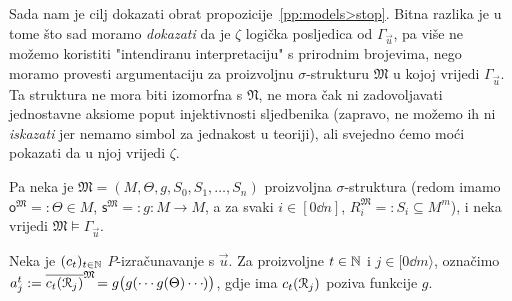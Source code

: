 Sada nam je cilj dokazati obrat propozicije~\ref{pp:models>stop}. Bitna razlika je u tome što sad moramo \emph{dokazati} da je $\zeta$ logička posljedica od $\Gamma_{\vec u}$, pa više ne možemo koristiti "intendiranu interpretaciju" s prirodnim brojevima, nego moramo provesti argumentaciju za proizvoljnu $\sigma$-strukturu $\mathfrak M$ u kojoj vrijedi $\Gamma_{\vec u}$. Ta struktura ne mora biti izomorfna s $\mathfrak N$, ne mora čak ni zadovoljavati jednostavne aksiome poput injektivnosti sljedbenika (zapravo, ne možemo ih ni \emph{iskazati} jer nemamo simbol za jednakost u teoriji), ali svejedno ćemo moći pokazati da u njoj vrijedi $\zeta$.

Pa neka je $\mathfrak M=(M,\Theta,g,S_0,S_1,\dotsc,S_n)$ proizvoljna $\sigma$-struktura (redom imamo $\mathsf o^{\mathfrak M}=:\Theta\in M$, $\mathsf s^{\mathfrak M}=:g:M\to M$, a za svaki $i\in[0\dd n]$, $R_i^{\mathfrak M}=:S_i\subseteq M^m$), i neka vrijedi $\mathfrak M\models\Gamma_{\vec u}$.

Neka je $(c_t)_{t\in{\mathbb N}}$ $P$-izračunavanje s $\vec u$. Za proizvoljne $t\in{\mathbb N}$ i $j\in[0\dd m\rangle$, označimo\\ $a_j^t:=\overline{c_t(\mathcal R_{j})}^{\mathfrak M}\!=g\bigl(g(\dotsb g(\Theta)\dotsb\mspace{-1mu})\bigr)$, gdje ima $c_t(\mathcal R_{j})$ poziva funkcije $g$.

